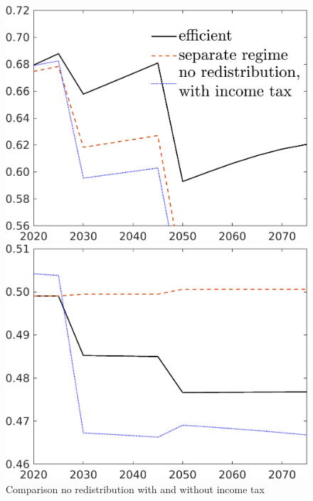 \begin{figure}[h!!]
	\centering
	\caption{Comparison no redistribution with and without income tax}\label{fig:comp_nored}
	
	\begin{minipage}[]{0.32\textwidth}
		\includegraphics[width=1\textwidth]{../../codding_model/own_basedOnFried/optimalPol_190722_tidiedUp/figures/all_July22/C_DDCompEffOPT_T_NoTaus_pol3_spillover0_noskill0_sep1_xgrowth0_etaa0.79_lgd1_lff0.png}
	\end{minipage}
	\begin{minipage}[]{0.32\textwidth}
		\includegraphics[width=1\textwidth]{../../codding_model/own_basedOnFried/optimalPol_190722_tidiedUp/figures/all_July22/hh_DDCompEffOPT_T_NoTaus_pol3_spillover0_noskill0_sep1_xgrowth0_etaa0.79_lgd0_lff0.png}

\end{minipage}
\end{figure}
